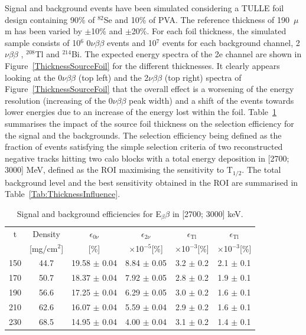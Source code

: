 \documentclass[main.tex]{subfiles}
\begin{document}
\NI Signal and background events have been simulated considering a TULLE foil design containing 90\% of $^{\text{82}}$Se and 10\% of PVA. The reference thickness of 190~$\mu$m has been varied by $\pm$10\% and $\pm$20\%. For each foil thickness, the simulated sample consists of 10$^\text{6}$ 0$\nu\beta\beta$ events and 10$^\text{7}$ events for each background channel, 2$\nu\beta\beta$ , $^{\text{208}}$Tl and $^{\text{214}}$Bi. The expected energy spectra of the 2e channel are shown in Figure~\ref{ThicknessSourceFoil} for the different thicknesses. It clearly appears looking at the 0$\nu\beta\beta$ (top left) and the 2$\nu\beta\beta$ (top right) spectra of Figure~\ref{ThicknessSourceFoil} that the overall effect is a worsening of the energy resolution (increasing of the 0$\nu\beta\beta$ peak width) and a shift of the events towards lower energies due to an increase of the energy lost within the foil. Table~\ref{tab:SignalBkgDifferentThickness} summarises the impact of the source foil thickness on the selection efficiency for the signal and the backgrounds. The selection efficiency being defined as the fraction of events satisfying the simple selection criteria of two reconstructed negative tracks hitting two calo blocks with a total energy deposition in [2700; 3000] MeV, defined as the ROI maximising the sensitivity to T$_{\text{1/2}}$. The total background level and the best sensitivity obtained in the ROI are summarised in Table~\ref{Tab:ThicknessInfluence}.



\begin{table}
\centering
\begin{tabular}{c|c|c|c|c|c}
\toprule
t & Density & $\epsilon_{\text{0}\nu}$ & $\epsilon_{\text{2}\nu}$ & $\epsilon_{\text{Tl}}$ & $\epsilon_{\text{Tl}}$ \\[0.1cm] 
[$\mu$m] & [mg/cm$^\text{2}$] & [\%] & $\times$10$^{-\text{5}}$[\%] & $\times$10$^{-\text{3}}$[\%] & $\times$10$^{-\text{3}}$[\%] \\[0.1cm]
\hline
150 & 44.7 & 19.58 $\pm$ 0.04 & 8.84 $\pm$ 0.05 & 3.2 $\pm$ 0.2 & 2.1 $\pm$ 0.1 \\
\hline
170 & 50.7 & 18.37 $\pm$ 0.04 & 7.92 $\pm$ 0.05 & 2.8 $\pm$ 0.2 & 1.9 $\pm$ 0.1 \\
\hline
190 & 56.6 & 17.25 $\pm$ 0.04 & 6.29 $\pm$ 0.05 & 3.0 $\pm$ 0.2 & 1.6 $\pm$ 0.1 \\
\hline
210 & 62.6 & 16.07 $\pm$ 0.04 & 5.59 $\pm$ 0.04 & 2.9 $\pm$ 0.2 & 1.6 $\pm$ 0.1 \\
\hline
230 & 68.5 & 14.95 $\pm$ 0.04 & 4.00 $\pm$ 0.04 & 3.1 $\pm$ 0.2 & 1.4 $\pm$ 0.1 \\
\bottomrule
\end{tabular}
\caption{Signal and background efficiencies for E$_\beta\beta$ in [2700; 3000] keV.}
\label{tab:SignalBkgDifferentThickness}
\end{table}
\end{document}
